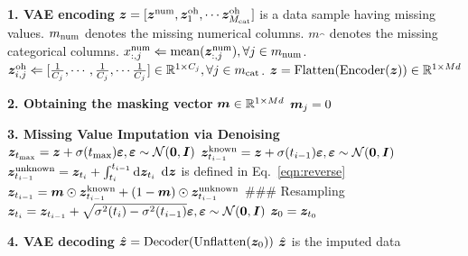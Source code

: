\begin{algorithm}[H]
    \centering
    \caption{\modelname for Missing Value Imputation}\label{algorithm:imputation}
    \begin{algorithmic}[1]
        \STATE \textbf{1. VAE encoding}
        \STATE ${\bm{z}} = [{\bm{z}}^{{\rm num}}, {\bm{z}}^{{\rm oh}}_{1}, \cdots {\bm{z}}^{{\rm oh}}_{M_{{\rm cat}}}]$ is a data sample having missing values.
        \STATE ${m}_{{\rm num}}$ denotes the missing numerical columns.
        \STATE ${m}_{\cat}$ denotes the missing categorical columns.
        \STATE $x^{{\rm num}}_{:,j} \Leftarrow {\rm mean} ({\bm{z}}_{:, j}^{{\rm num}}), \forall j \in {m}_{{\rm num}}$.
        \STATE ${\bm{z}}_{i,j}^{{\rm oh}}\Leftarrow [\frac{1}{C_j}, \cdots,  \frac{1}{C_j}, \cdots \frac{1}{C_j}] \in {\mathbb{R}}^{1\times C_j}, \forall j \in {m}_{{\rm cat}}$.
        \STATE ${\bm{z}} = {\rm Flatten} ({\rm Encoder}({\bm{z}})) \in {\mathbb{R}}^{1\times Md} $
        \STATE
        
        \STATE \textbf{2. Obtaining the masking vector}
        \STATE ${\bm{m}} \in {\mathbb{R}}^{1\times Md}$
        \STATE ${\bm{m}}_j = 0$ 
        \ENDIF  
        \ENDFOR
        \STATE

        \STATE \textbf{3. Missing Value Imputation via Denoising}
        \STATE ${\bm{z}}_{t_{\max}} = {\bm{z}} + \sigma(t_{\max})\bm{\varepsilon}, \bm{\varepsilon} \sim {\mathcal{N}}(\bm{0}, {\bm{I}}) $
        \STATE ${\bm{z}}_{t_{i-1}}^{\rm known} = {\bm{z}} + \sigma(t_{i-1}) \bm{\varepsilon}, \bm{\varepsilon} \sim {\mathcal{N}}(\bm{0}, {\bm{I}}) $
        \STATE ${\bm{z}}_{t_{i-1}}^{\rm unknown}  = {\bm{z}}_{t_i} + \int_{t_i}^{t_{i-1}} {\rm d}{\bm{z}}_{t_i}$
        \STATE ${\rm d} {\bm{z}}$ is defined in Eq.~\ref{eqn:reverse}
        \STATE $ {\bm{z}}_{t_{i-1}} = {\bm{m}} \odot {\bm{z}}_{t_{i-1}}^{\rm known} + (1-{\bm{m}}) \odot {\bm{z}}_{t_{i-1}}^{\rm unknown}$
        \STATE \#\#\# Resampling
        \STATE ${\bm{z}}_{t_{i}} = {\bm{z}}_{t_{i-1}} + \sqrt{\sigma^2(t_{i}) - \sigma^2(t_{i-1}) }\bm{\varepsilon}, \bm{\varepsilon} \sim {\mathcal{N}}(\bm{0}, {\bm{I}}) $
        \ENDIF  
        \ENDFOR
        \ENDFOR
        \STATE ${\bm{z}}_{0} = {\bm{z}}_{t_0}$
        \STATE
        
        \STATE \textbf{4. VAE decoding}
        \STATE $\hat{{\bm{z}}} = {\rm Decoder} ({\rm Unflatten} ({\bm{z}}_0))$ 
        \STATE $\hat{{\bm{z}}} $ is the imputed data
    \end{algorithmic}
\end{algorithm}

